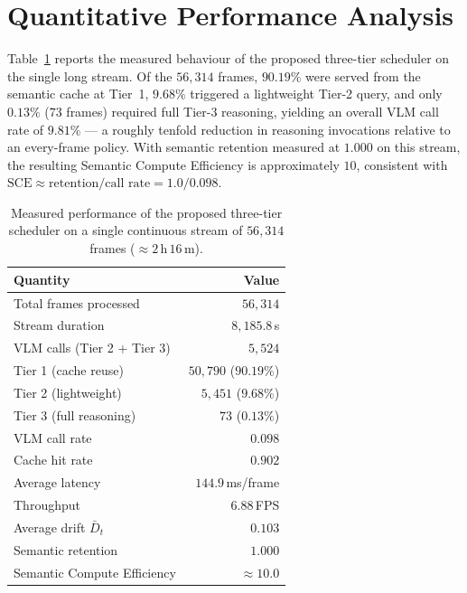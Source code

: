 \section{Quantitative Performance Analysis}
\label{sec:exp-results}

Table~\ref{tab:proposed-results} reports the measured behaviour of the
proposed three-tier scheduler on the single long stream. Of the $56{,}314$
frames, $90.19\%$ were served from the semantic cache at Tier~1, $9.68\%$
triggered a lightweight Tier-2 query, and only $0.13\%$ ($73$ frames) required
full Tier-3 reasoning, yielding an overall VLM call rate of $9.81\%$ --- a
roughly tenfold reduction in reasoning invocations relative to an every-frame
policy. With semantic retention measured at $1.000$ on this stream, the
resulting Semantic Compute Efficiency is approximately $10$, consistent with
$\mathrm{SCE} \approx \text{retention} / \text{call rate} = 1.0/0.098$.

\begin{table}[htbp]
\centering
\caption[Measured proposed-scheduler performance]{Measured performance of the
proposed three-tier scheduler on a single continuous stream of $56{,}314$
frames ($\approx 2$\,h\,$16$\,m).}
\label{tab:proposed-results}
\small
\begin{tabular}{@{}lr@{}}
\toprule
\textbf{Quantity} & \textbf{Value} \\
\midrule
Total frames processed        & $56{,}314$ \\
Stream duration               & $8{,}185.8$\,s \\
VLM calls (Tier 2 + Tier 3)   & $5{,}524$ \\
\quad Tier 1 (cache reuse)    & $50{,}790$ \;($90.19\%$) \\
\quad Tier 2 (lightweight)    & $5{,}451$ \;($9.68\%$) \\
\quad Tier 3 (full reasoning) & $73$ \;($0.13\%$) \\
VLM call rate                 & $0.098$ \\
Cache hit rate                & $0.902$ \\
Average latency               & $144.9$\,ms/frame \\
Throughput                    & $6.88$\,FPS \\
Average drift $\bar{D}_t$     & $0.103$ \\
Semantic retention            & $1.000$ \\
Semantic Compute Efficiency   & $\approx 10.0$ \\
\bottomrule
\end{tabular}
\end{table}

